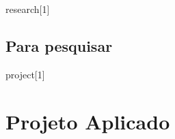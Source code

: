 
\newenvironment{task}[1]{%
	\stepcounter{ativ}
	\subsection{Atividade \theativ: #1}
}{}


\newenvironment{reflection}[1]{%
	\subsection{\textcolor{box1}{Para refletir}}
}{}

\newenvironment{observation}{%
	\paragraph{Observação:}
}{}

\newenvironment{observationtitle}[1]{%
	\paragraph{Observação: #1}
}{}




\newenvironment{example}[1]{%
	\stepcounter{ex}
	\sectioncolor{cor1}
	\subsection{Exemplo \theex: #1}
}

\newenvironment{research}[1]{%
	\subsection{\textcolor{box1}{Para pesquisar}}
}

\newenvironment{knowledge}[1]{\par
	\subsection{\textcolor{box1}{Você sabia?}}
}



\newenvironment{project}[1]{%
	\section*{\textcolor{\currentcolor}{Projeto Aplicado}}
}




